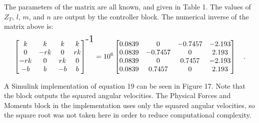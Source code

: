 The parameters of the matrix are all known, and given in Table 1. The values of $Z_T$, $l$, $m$, and $n$ are output by the controller block. The numerical inverse of the matrix above is:
\begin{equation*}
    \begin{bmatrix}
        k & k & k & k \\ 
        0 & -rk & 0 & rk \\ 
        -rk & 0 & rk & 0 \\ 
        -b & b & -b & b
    \end{bmatrix}^{\text{\Large -1}}
    =
    10^6
    \begin{bmatrix}
        0.0839 & 0 & -0.7457 & -2.193 \\ 
        0.0839 & -0.7457 & 0 & 2.193 \\ 
        0.0839 & 0 & 0.7457 & -2.193 \\ 
        0.0839 & 0.7457 & 0 & 2.193
    \end{bmatrix} \quad .
\end{equation*}

A Simulink implementation of equation 19 can be seen in Figure 17. Note that the block outputs the squared angular velocities. The Physical Forces and Moments block in the implementation uses only the squared angular velocities, so the square root was not taken here in order to reduce computational complexity.
